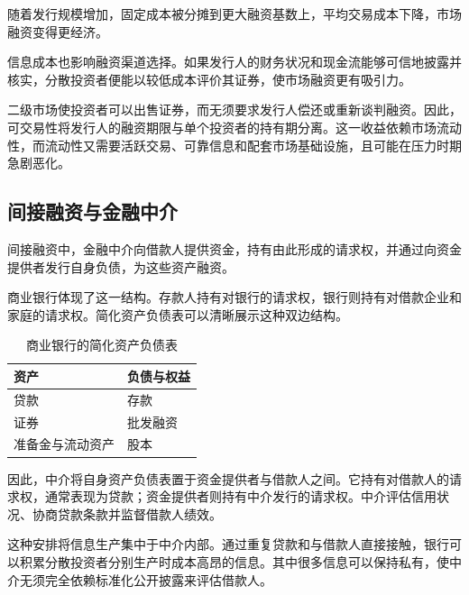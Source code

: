 随着发行规模增加，固定成本被分摊到更大融资基数上，平均交易成本下降，市场融资变得更经济。

信息成本也影响融资渠道选择。如果发行人的财务状况和现金流能够可信地披露并核实，分散投资者便能以较低成本评价其证券，使市场融资更有吸引力。

二级市场使投资者可以出售证券，而无须要求发行人偿还或重新谈判融资。因此，可交易性将发行人的融资期限与单个投资者的持有期分离。这一收益依赖市场流动性，而流动性又需要活跃交易、可靠信息和配套市场基础设施，且可能在压力时期急剧恶化。

\subsection{间接融资与金融中介}

间接融资中，金融中介向借款人提供资金，持有由此形成的请求权，并通过向资金提供者发行自身负债，为这些资产融资。

商业银行体现了这一结构。存款人持有对银行的请求权，银行则持有对借款企业和家庭的请求权。简化资产负债表可以清晰展示这种双边结构。
 
\begin{table}[htbp]

\centering

\caption{商业银行的简化资产负债表}

\label{tab:ch4-bank-balance-sheet}

\begin{tabularx}{0.78\textwidth}{@{}X X@{}}

\toprule

\textbf{资产} & \textbf{负债与权益} \\

\midrule

贷款 & 存款 \\
证券 & 批发融资 \\
准备金与流动资产 & 股本 \\

\bottomrule

\end{tabularx}

\end{table}

因此，中介将自身资产负债表置于资金提供者与借款人之间。它持有对借款人的请求权，通常表现为贷款；资金提供者则持有中介发行的请求权。中介评估信用状况、协商贷款条款并监督借款人绩效。

这种安排将信息生产集中于中介内部。通过重复贷款和与借款人直接接触，银行可以积累分散投资者分别生产时成本高昂的信息。其中很多信息可以保持私有，使中介无须完全依赖标准化公开披露来评估借款人。

